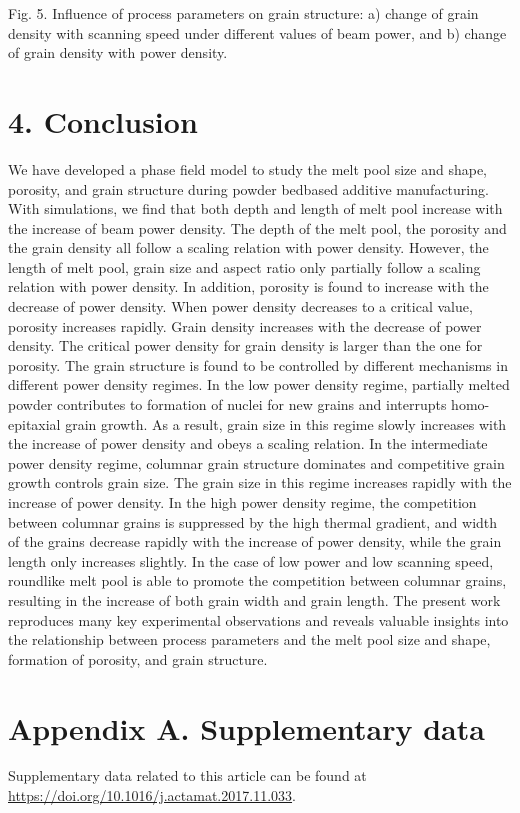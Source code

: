 \documentclass[10pt]{article}
\begin{document}
Fig. 5. Influence of process parameters on grain structure: a) change of grain density with scanning speed under different values of beam power, and b) change of grain density with power density.

\section*{4. Conclusion}
We have developed a phase field model to study the melt pool size and shape, porosity, and grain structure during powder bedbased additive manufacturing. With simulations, we find that both depth and length of melt pool increase with the increase of beam power density. The depth of the melt pool, the porosity and the grain density all follow a scaling relation with power density. However, the length of melt pool, grain size and aspect ratio only partially follow a scaling relation with power density. In addition, porosity is found to increase with the decrease of power density. When power density decreases to a critical value, porosity increases rapidly. Grain density increases with the decrease of power density. The critical power density for grain density is larger than the one for porosity. The grain structure is found to be controlled by different mechanisms in different power density regimes. In the low power density regime, partially melted powder contributes to formation of nuclei for new grains and interrupts homo-epitaxial grain growth. As a result, grain size in this regime slowly increases with the increase of power density and obeys a scaling relation. In the intermediate power density regime, columnar grain structure dominates and competitive grain growth controls grain size. The grain size in this regime increases rapidly with the increase of power density. In the high power density regime, the competition between columnar grains is suppressed by the high thermal gradient, and width of the grains decrease rapidly with the increase of power density, while the grain length only increases slightly. In the case of low power and low scanning speed, roundlike melt pool is able to promote the competition between columnar grains, resulting in the increase of both grain width and grain length. The present work reproduces many key experimental observations and reveals valuable insights into the relationship between process parameters and the melt pool size and shape, formation of porosity, and grain structure.

\section*{Appendix A. Supplementary data}
Supplementary data related to this article can be found at \href{https://doi.org/10.1016/j.actamat.2017.11.033}{https://doi.org/10.1016/j.actamat.2017.11.033}.
\end{document}
